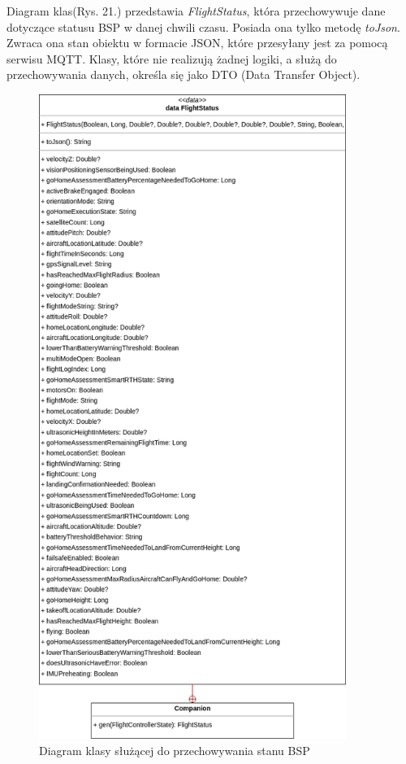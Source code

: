 Diagram klas(Rys. 21.) przedstawia \textit{FlightStatus}, która przechowywuje dane dotyczące statusu BSP w danej chwili czasu. Posiada ona tylko metodę \textit{toJson}. Zwraca ona stan obiektu w formacie JSON, które przesyłany jest za pomocą serwisu MQTT. Klasy, które nie realizują żadnej logiki, a służą do przechowywania danych, określa się jako DTO (Data Transfer Object).

\begin{figure}[!htp]
  \centering
  \includegraphics[width=10cm]{./Obrazy/FlightStatus.png}
  \caption{Diagram klasy służącej do przechowywania stanu BSP}
  \end{figure}

\newpage



